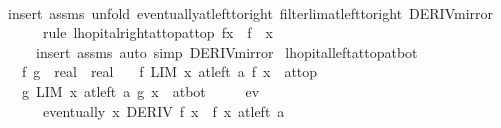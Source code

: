 \begin{isabellebody}
%
\isadelimproof
\ \ %
\endisadelimproof
%
\isatagproof
{}\isamarkupfalse%
\ {\isacharparenleft}{\kern0pt}insert\ assms{\isacharcomma}{\kern0pt}\ unfold\ eventually{\isacharunderscore}{\kern0pt}at{\isacharunderscore}{\kern0pt}left{\isacharunderscore}{\kern0pt}to{\isacharunderscore}{\kern0pt}right\ filterlim{\isacharunderscore}{\kern0pt}at{\isacharunderscore}{\kern0pt}left{\isacharunderscore}{\kern0pt}to{\isacharunderscore}{\kern0pt}right\ DERIV{\isacharunderscore}{\kern0pt}mirror{\isacharcomma}{\kern0pt}\isanewline
\ \ \ \ \ \ rule\ lhopital{\isacharunderscore}{\kern0pt}right{\isacharunderscore}{\kern0pt}at{\isacharunderscore}{\kern0pt}top{\isacharunderscore}{\kern0pt}at{\isacharunderscore}{\kern0pt}top{\isacharbrackleft}{\kern0pt}\ f{\isacharprime}{\kern0pt}{\isacharequal}{\kern0pt}{\isachardoublequoteopen}{\isasymlambda}x{\isachardot}{\kern0pt}\ {\isacharminus}{\kern0pt}\ f{\isacharprime}{\kern0pt}\ {\isacharparenleft}{\kern0pt}{\isacharminus}{\kern0pt}\ x{\isacharparenright}{\kern0pt}{\isachardoublequoteclose}{\isacharbrackright}{\kern0pt}{\isacharparenright}{\kern0pt}\ \isanewline
\ \ \ \ \ {\isacharparenleft}{\kern0pt}insert\ assms{\isacharcomma}{\kern0pt}\ auto\ simp{\isacharcolon}{\kern0pt}\ DERIV{\isacharunderscore}{\kern0pt}mirror{\isacharparenright}{\kern0pt}%
\endisatagproof
{\isafoldproof}%
%
\isadelimproof
\isanewline
%
\endisadelimproof
\isanewline
{}\isamarkupfalse%
\ lhopital{\isacharunderscore}{\kern0pt}left{\isacharunderscore}{\kern0pt}at{\isacharunderscore}{\kern0pt}top{\isacharunderscore}{\kern0pt}at{\isacharunderscore}{\kern0pt}bot{\isacharcolon}{\kern0pt}\isanewline
\ \ \ f\ g\ {\isacharcolon}{\kern0pt}{\isacharcolon}{\kern0pt}\ {\isachardoublequoteopen}real\ {\isasymRightarrow}\ real{\isachardoublequoteclose}\isanewline
\ \ \ f{\isacharunderscore}{\kern0pt}{}{\isacharcolon}{\kern0pt}\ {\isachardoublequoteopen}LIM\ x\ at{\isacharunderscore}{\kern0pt}left\ a{\isachardot}{\kern0pt}\ f\ x\ {\isacharcolon}{\kern0pt}{\isachargreater}{\kern0pt}\ at{\isacharunderscore}{\kern0pt}top{\isachardoublequoteclose}\isanewline
\ \ \ g{\isacharunderscore}{\kern0pt}{}{\isacharcolon}{\kern0pt}\ {\isachardoublequoteopen}LIM\ x\ at{\isacharunderscore}{\kern0pt}left\ a{\isachardot}{\kern0pt}\ g\ x\ {\isacharcolon}{\kern0pt}{\isachargreater}{\kern0pt}\ at{\isacharunderscore}{\kern0pt}bot{\isachardoublequoteclose}\isanewline
\ \ \ \ \ ev{\isacharcolon}{\kern0pt}\isanewline
\ \ \ \ \ \ {\isachardoublequoteopen}eventually\ {\isacharparenleft}{\kern0pt}{\isasymlambda}x{\isachardot}{\kern0pt}\ DERIV\ f\ x\ {\isacharcolon}{\kern0pt}{\isachargreater}{\kern0pt}\ f{\isacharprime}{\kern0pt}\ x{\isacharparenright}{\kern0pt}\ {\isacharparenleft}{\kern0pt}at{\isacharunderscore}{\kern0pt}left\ a{\isacharparenright}{\kern0pt}{\isachardoublequoteclose}\isanewline

\end{isabellebody}
